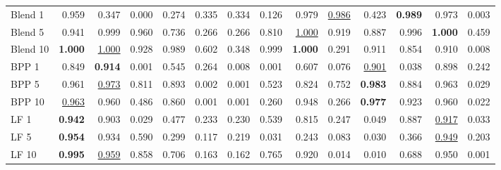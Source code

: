\begin{table}[htbp]
\begin{adjustbox}{max width=\textwidth}
\begin{tabular}{lrrrrrrrrrrrrr}
Blend 1 & 0.959 & \textcolor{black!45}{0.347} & \textcolor{black!45}{0.000} & \textcolor{black!45}{0.274} & \textcolor{black!45}{0.335} & \textcolor{black!45}{0.334} & \textcolor{black!45}{0.126} & 0.979 & \underline{0.986} & \textcolor{black!45}{0.423} & \textbf{0.989} & 0.973 & \textcolor{black!45}{0.003} \\
Blend 5 & 0.941 & 0.999 & 0.960 & 0.736 & \textcolor{black!45}{0.266} & \textcolor{black!45}{0.266} & 0.810 & \underline{1.000} & 0.919 & 0.887 & 0.996 & \textbf{1.000} & \textcolor{black!45}{0.459} \\
Blend 10 & \textbf{1.000} & \underline{1.000} & 0.928 & 0.989 & 0.602 & \textcolor{black!45}{0.348} & 0.999 & \textbf{1.000} & \textcolor{black!45}{0.291} & 0.911 & 0.854 & 0.910 & \textcolor{black!45}{0.008} \\
BPP 1 & 0.849 & \textbf{0.914} & \textcolor{black!45}{0.001} & 0.545 & \textcolor{black!45}{0.264} & \textcolor{black!45}{0.008} & \textcolor{black!45}{0.001} & 0.607 & \textcolor{black!45}{0.076} & \underline{0.901} & \textcolor{black!45}{0.038} & 0.898 & \textcolor{black!45}{0.242} \\
BPP 5 & 0.961 & \underline{0.973} & 0.811 & 0.893 & \textcolor{black!45}{0.002} & \textcolor{black!45}{0.001} & 0.523 & 0.824 & 0.752 & \textbf{0.983} & 0.884 & 0.963 & \textcolor{black!45}{0.029} \\
BPP 10 & \underline{0.963} & 0.960 & \textcolor{black!45}{0.486} & 0.860 & \textcolor{black!45}{0.001} & \textcolor{black!45}{0.001} & \textcolor{black!45}{0.260} & 0.948 & \textcolor{black!45}{0.266} & \textbf{0.977} & 0.923 & 0.960 & \textcolor{black!45}{0.022} \\
LF 1 & \textbf{0.942} & 0.903 & \textcolor{black!45}{0.029} & \textcolor{black!45}{0.477} & \textcolor{black!45}{0.233} & \textcolor{black!45}{0.230} & 0.539 & 0.815 & \textcolor{black!45}{0.247} & \textcolor{black!45}{0.049} & 0.887 & \underline{0.917} & \textcolor{black!45}{0.033} \\
LF 5 & \textbf{0.954} & 0.934 & 0.590 & \textcolor{black!45}{0.299} & \textcolor{black!45}{0.117} & \textcolor{black!45}{0.219} & \textcolor{black!45}{0.031} & \textcolor{black!45}{0.243} & \textcolor{black!45}{0.083} & \textcolor{black!45}{0.030} & \textcolor{black!45}{0.366} & \underline{0.949} & \textcolor{black!45}{0.203} \\
LF 10 & \textbf{0.995} & \underline{0.959} & 0.858 & 0.706 & \textcolor{black!45}{0.163} & \textcolor{black!45}{0.162} & 0.765 & 0.920 & \textcolor{black!45}{0.014} & \textcolor{black!45}{0.010} & 0.688 & 0.950 & \textcolor{black!45}{0.001} \\

\end{tabular}
\end{adjustbox}
\end{table}
